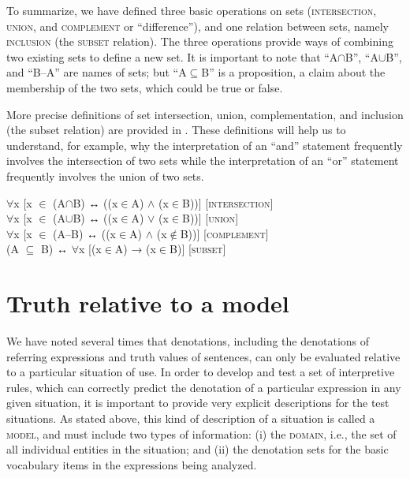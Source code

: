 To summarize, we have defined three basic operations on sets (\textsc{intersection}, \textsc{union}, and \textsc{complement} or “difference”), and one relation between sets, namely \textsc{inclusion} (the \textsc{subset} relation). The three operations provide ways of combining two existing sets to define a new set. It is important to note that “A${\cap}$B”, “A${\cup}$B”, and “B–A” are names of sets; but “A${\subseteq}$B” is a proposition, a claim about the membership of the two sets, which could be true or false.



More precise definitions of set intersection, union, complementation, and inclusion (the subset relation) are provided in . These definitions will help us to understand, for example, why the interpretation of an “and” statement frequently involves the intersection of two sets while the interpretation of an “or” statement frequently involves the union of two sets.


\ea \label{extab:13.19}
${\forall}$x [x ${\in}$ (A${\cap}$B)  ↔   ((x${\in}$A) $\wedge$ (x${\in}$B))] \hfill [\textsc{intersection}]\\
${\forall}$x [x ${\in}$ (A${\cup}$B)  ↔   ((x${\in}$A) $\vee$ (x${\in}$B))] \hfill [\textsc{union}]\\
${\forall}$x [x ${\in}$ (A–B)  ↔   ((x${\in}$A) $\wedge$ (x${\notin}$B))] \hfill [\textsc{complement}]\\
(A ${\subseteq}$ B)  ↔   ${\forall}$x [(x${\in}$A) → (x${\in}$B)] \hfill [\textsc{subset}]
\z

\section{Truth relative to a model}\label{sec:13.4}

We have noted several times that denotations, including the denotations of referring expressions and truth values of sentences, can only be evaluated relative to a particular situation of use. In order to develop and test a set of interpretive rules, which can correctly predict the denotation of a particular expression in any given situation, it is important to provide very explicit descriptions for the test situations. As stated above, this kind of description of a situation is called a \textsc{model}, and must include two types of information: (i) the \textsc{domain}, i.e., the set of all individual entities in the situation; and (ii) the denotation sets for the basic vocabulary items in the expressions being analyzed.



